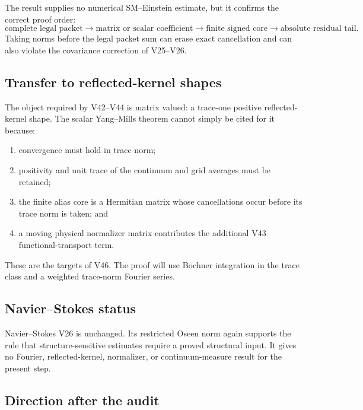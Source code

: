 \documentclass[11pt]{article}
\theoremstyle{remark}
\begin{document}
The result supplies no numerical SM--Einstein estimate, but it
confirms the correct proof order:
\begin{equation}
 \boxed{
 \text{complete legal packet}
 \longrightarrow
 \text{matrix or scalar coefficient}
 \longrightarrow
 \text{finite signed core}
 \longrightarrow
 \text{absolute residual tail}.}                \tag{45.3}
\end{equation}
Taking norms before the legal packet sum can erase exact cancellation
and can also violate the covariance correction of V25--V26.

\subsection{Transfer to reflected-kernel shapes}

The object required by V42--V44 is matrix valued: a trace-one
positive reflected-kernel shape.  The scalar Yang--Mills theorem
cannot simply be cited for it because:
\begin{enumerate}
\item convergence must hold in trace norm;
\item positivity and unit trace of the continuum and grid averages
must be retained;
\item the finite alias core is a Hermitian matrix whose cancellations
occur before its trace norm is taken; and
\item a moving physical normalizer matrix contributes the additional
V43 functional-transport term.
\end{enumerate}

These are the targets of V46.  The proof will use Bochner integration
in the trace class and a weighted trace-norm Fourier series.

\subsection{Navier--Stokes status}

Navier--Stokes V26 is unchanged.  Its restricted Oseen norm again
supports the rule that structure-sensitive estimates require a
proved structural input.  It gives no Fourier, reflected-kernel,
normalizer, or continuum-measure result for the present step.

\subsection{Direction after the audit}
\end{document}
